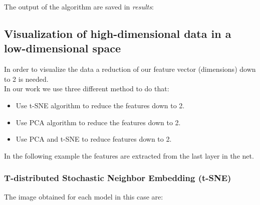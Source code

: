 \documentclass[12pt]{article} %
\begin{document}
\begin{figure}[H] %
 \end{figure}

 The output of the algorithm are saved in \textit{results}:

\begin{figure}[H] %
 \end{figure}

\newpage

\subsection {Visualization of high-dimensional data in a low-dimensional space}
In order to visualize the data a reduction of our feature vector (dimensions) down to 2 is needed.\\
In our work we use three different method to do that:
\begin{itemize}
\item Use t-SNE algorithm to reduce the features down to 2.
\item Use PCA algorithm to reduce the features down to 2.
\item Use PCA and t-SNE to reduce features down to 2.
\end{itemize}
In the following example the features are extracted from the last layer in the net.\\

 \subsubsection {T-distributed Stochastic Neighbor Embedding (t-SNE)}
The image obtained for each model in this case are:\\
\end{document}
